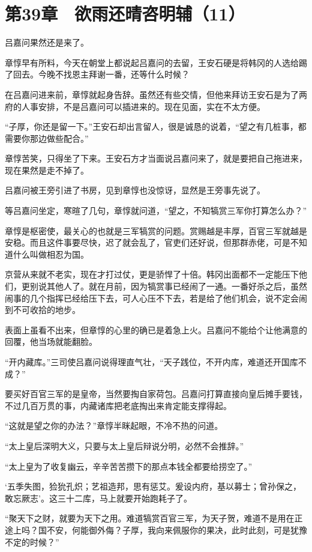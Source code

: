 \section{第39章　欲雨还晴咨明辅（11）}

吕嘉问果然还是来了。

章惇早有所料，今天在朝堂上都说起吕嘉问的去留，王安石硬是将韩冈的人选给踢了回去。今晚不找恩主拜谢一番，还等什么时候？

在吕嘉问进来前，章惇就起身告辞。虽然还有些交情，但他来拜访王安石是为了两府的人事安排，不是吕嘉问可以插进来的。现在见面，实在不太方便。

“子厚，你还是留一下。”王安石却出言留人，很是诚恳的说着，“望之有几桩事，都需要你那边做些配合。”

章惇苦笑，只得坐了下来。王安石方才当面说吕嘉问来了，就是要把自己拖进来，现在果然是走不掉了。

吕嘉问被王旁引进了书房，见到章惇也没惊讶，显然是王旁事先说了。

等吕嘉问坐定，寒暄了几句，章惇就问道，“望之，不知犒赏三军你打算怎么办？”

章惇是枢密使，最关心的也就是三军犒赏的问题。赏赐越是丰厚，百官三军就越是安稳。而且这件事要尽快，迟了就会乱了，官吏们还好说，但那群赤佬，可是不知道什么叫做相忍为国。

京营从来就不老实，现在才打过仗，更是骄悍了十倍。韩冈出面都不一定能压下他们，更别说其他人了。就在月前，因为犒赏事已经闹了一通。一番好杀之后，虽然闹事的几个指挥已经给压下去，可人心压不下去，若是给了他们机会，说不定会闹到不可收拾的地步。

表面上虽看不出来，但章惇的心里的确已是着急上火。吕嘉问不能给个让他满意的回覆，他当场就能翻脸。

“开内藏库。”三司使吕嘉问说得理直气壮，“天子践位，不开内库，难道还开国库不成？”

要买好百官三军的是皇帝，当然要掏自家荷包。吕嘉问打算直接向皇后摊手要钱，不过几百万贯的事，内藏诸库把老底掏出来肯定能支撑得起。

“这就是望之你的办法？”章惇半眯起眼，不冷不热的问道。

“太上皇后深明大义，只要与太上皇后辩说分明，必然不会推辞。”

“太上皇为了收复幽云，辛辛苦苦攒下的那点本钱全都要给捞空了。”

‘五季失图，猃狁孔炽；艺祖造邦，思有惩艾。爰设内府，基以募士；曾孙保之，敢忘厥志’。这三十二库，马上就要开始跑耗子了。

“聚天下之财，就要为天下之用。难道犒赏百官三军，为天子贺，难道不是用在正途上吗？国不安，何能御外侮？子厚，我向来佩服你的果决，此时此刻，可是犹豫不定的时候？”

